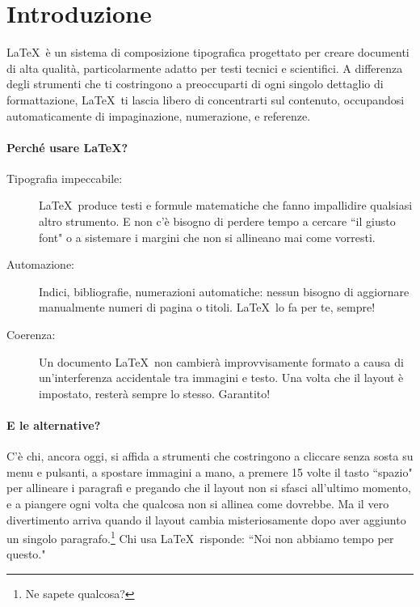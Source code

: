\section*{Introduzione}
\LaTeX\ è un sistema di composizione tipografica progettato per creare documenti di alta qualità, particolarmente adatto per testi tecnici e scientifici.
A differenza degli strumenti che ti costringono a preoccuparti di ogni singolo dettaglio di formattazione, \LaTeX\ ti lascia libero di concentrarti sul contenuto, occupandosi automaticamente di impaginazione, numerazione, e referenze.

\paragraph{Perché usare \LaTeX?}
\begin{description}
    \item[Tipografia impeccabile:] \LaTeX\ produce testi e formule matematiche che fanno impallidire qualsiasi altro strumento. E non c'è bisogno di perdere tempo a cercare ``il giusto font" o a sistemare i margini che non si allineano mai come vorresti.
    
    \item[Automazione:] Indici, bibliografie, numerazioni automatiche: nessun bisogno di aggiornare manualmente numeri di pagina o titoli. \LaTeX\ lo fa per te, sempre!
    
    \item[Coerenza:] Un documento \LaTeX\ non cambierà improvvisamente formato a causa di un'interferenza accidentale tra immagini e testo. Una volta che il layout è impostato, resterà sempre lo stesso. Garantito!
    
\end{description}
 
\paragraph{E le alternative?}
C'è chi, ancora oggi, si affida a strumenti che costringono a cliccare senza sosta su menu e pulsanti, a spostare immagini a mano, a premere 15 volte il tasto ``spazio" per allineare i paragrafi e pregando che il layout non si sfasci all'ultimo momento, e a piangere ogni volta che qualcosa non si allinea come dovrebbe.
Ma il vero divertimento arriva quando il layout cambia misteriosamente dopo aver aggiunto un singolo paragrafo.\footnote{Ne sapete qualcosa?}
Chi usa \LaTeX\ risponde: ``Noi non abbiamo tempo per questo."

